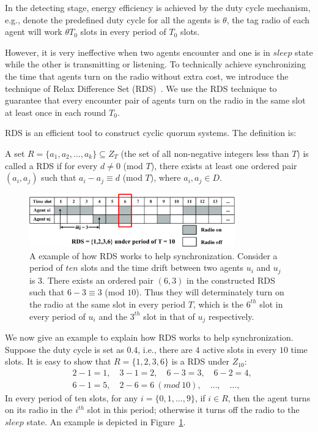 In the detecting stage,  
energy efficiency is achieved by the duty cycle mechanism, 
e.g., denote the predefined duty cycle for 
all the agents is $\theta$, the tag radio of each agent will work
$\theta T_0$ slots in every period of $T_0$ slots. 

However, it is very ineffective
when two agents encounter and one is in $sleep$ state while the other is transmitting
or listening. 
To technically achieve synchronizing the time that agents turn on the radio without extra cost,
we introduce the technique of Relax Difference Set (RDS)~\cite{luk1997two}.
We use the RDS technique to guarantee that every encounter pair 
of agents turn on the radio in the same slot at least once in each round $T_0$.

RDS is an efficient tool to construct cyclic quorum systems. 
The definition is:
\begin{definition}
A set $R=\{a_1,a_2,...,a_k\} \subseteq Z_T$ (the set of all non-negative integers less than $T$)
is called a RDS if for every $d \neq 0$ (mod $T$),
there exists at least one ordered pair $(a_i,a_j)$ such that $a_i - a_j \equiv d$ (mod $T$), 
where $a_i,a_j \in D$.
\end{definition}

\begin{figure}[h]
    \centering
    \includegraphics[width=3.5in]{figures/RDS}
    \caption{A example of how RDS works to help synchronization. Consider a period
    of $ten$ slots and the time drift between two agents $u_i$ and 
    $u_j$ is $3$. There exists an ordered pair $(6,3)$ in the constructed RDS such that $6 - 3 \equiv 3$ (mod $10$). Thus 
    they will determinately turn on the radio at the same slot in every period $T$, 
    which is the $6^{th}$ slot in every period of $u_i$ and the $3^{th}$ slot in that of $u_j$ respectively.}
    \label{exampleRDS}
\end{figure}

We now give an example to explain how RDS works to help synchronization.
Suppose the duty cycle is set as $0.4$, i.e., there are $4$ active slots 
in every $10$ time slots. It is easy to show that $R=\{1,2,3,6\}$ is a RDS
under $Z_{10}$:
\begin{align*}
    &2 - 1 = 1,\quad 3 - 1 = 2,\quad 6 - 3 = 3,\quad 6 - 2 = 4, \\
    &6 - 1 = 5,\quad {2 - 6 = 6}~{(mod~10)},\quad \dots,\quad \dots, 
\end{align*}
In every period of ten slots, for any $i = \{0,1,\dots,9\}$, if $i \in R$, then
the agent turns on its radio in the $i^{th}$ slot in this period; otherwise it turns off the 
radio to the $sleep$ state. An example is depicted in Figure~\ref{exampleRDS}. 



